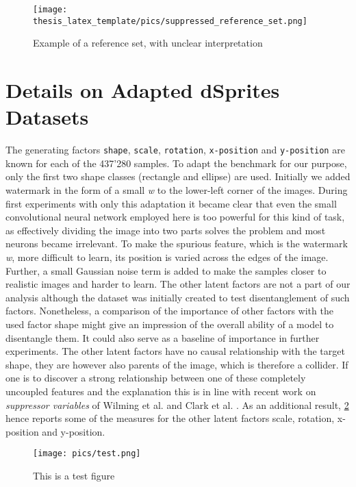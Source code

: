\begin{figure}
    \centering
    \texttt{[image: thesis\_latex\_template/pics/suppressed\_reference\_set.png]}
    \caption[Reference Set Interpretation]{Example of a reference set, with unclear interpretation}
    \label{fig:suppressor_ref}
\end{figure}

\section{Details on Adapted dSprites Datasets}\label{appendix:dsprites}

The generating factors \verb|shape|, \verb|scale|, \verb|rotation|, \verb|x-position| and \verb|y-position| are known for each of the 437'280 samples. 
To adapt the benchmark for our purpose, only the first two shape classes (rectangle and ellipse) are used. 
Initially we added watermark in the form of a small \textit{w} to the lower-left corner of the images. During first experiments with only this adaptation it became clear that even the small convolutional neural network employed here is too powerful for this kind of task, as effectively dividing the image into two parts solves the problem and most neurons became irrelevant.
To make the spurious feature, which is the watermark \textit{w}, more difficult to learn, its position is varied across the edges of the image. Further, a small Gaussian noise term is added to make the samples closer to realistic images and harder to learn. The other latent factors are not a part of our analysis although the dataset was initially created to test disentanglement of such factors. Nonetheless, a comparison of the importance of other factors with the used factor shape might give an impression of the overall ability of a model to disentangle them. It could also serve as a baseline of importance in further experiments. The other latent factors have no causal relationship with the target shape, they are however also parents of the image, which is therefore a collider. If one is to discover a strong relationship between one of these completely uncoupled features and the explanation this is in line with recent work on \textit{suppressor variables} of Wilming et al. and Clark et al. \cite{Wilming2023, Clark2023}. As an additional result, \cref{fig:other_factors} hence reports some of the measures for the other latent factors scale, rotation, x-position and y-position. \\

\begin{figure}[t!]
	\centering
	\texttt{[image: pics/test.png]}
	\caption[Other Factors Importance]{This is a test figure}
	\label{fig:other_factors}
\end{figure}


